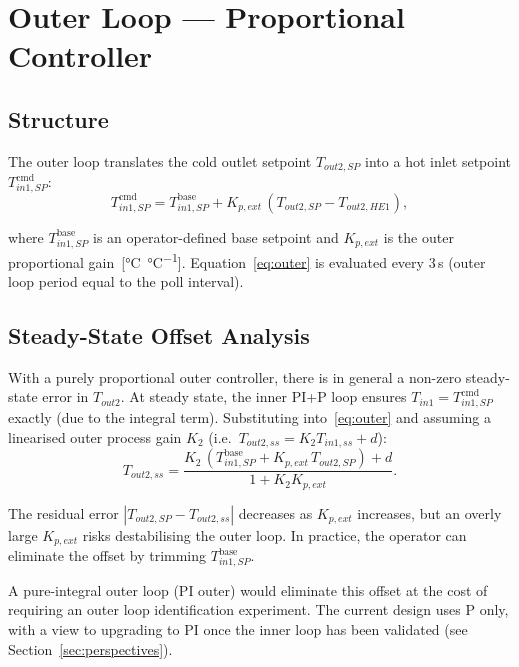 \section{Outer Loop --- Proportional Controller}

\subsection{Structure}

The outer loop translates the cold outlet setpoint $T_{out2,SP}$ into a hot inlet
setpoint $T_{in1,SP}^{\text{cmd}}$:
\begin{equation}
  T_{in1,SP}^{\text{cmd}}
  = T_{in1,SP}^{\text{base}} + K_{p,ext}\,(T_{out2,SP} - T_{out2,HE1}),
  \label{eq:outer}
\end{equation}

where $T_{in1,SP}^{\text{base}}$ is an operator-defined base setpoint and $K_{p,ext}$
is the outer proportional gain~[\si{\degreeCelsius\per\degreeCelsius}].
Equation~\eqref{eq:outer} is evaluated every 3\,s (outer loop period equal to the
poll interval).

\subsection{Steady-State Offset Analysis}

With a purely proportional outer controller, there is in general a non-zero
steady-state error in $T_{out2}$. At steady state, the inner PI+P loop ensures
$T_{in1} = T_{in1,SP}^{\text{cmd}}$ exactly (due to the integral term).
Substituting into~\eqref{eq:outer} and assuming a linearised outer process gain $K_2$
(i.e.\ $T_{out2,ss} = K_2 T_{in1,ss} + d$):
\begin{equation}
  T_{out2,ss}
  = \frac{K_2\,(T_{in1,SP}^{\text{base}} + K_{p,ext}\,T_{out2,SP}) + d}{1 + K_2 K_{p,ext}}.
  \label{eq:outer_ss}
\end{equation}

The residual error $|T_{out2,SP} - T_{out2,ss}|$ decreases as $K_{p,ext}$ increases,
but an overly large $K_{p,ext}$ risks destabilising the outer loop. In practice, the
operator can eliminate the offset by trimming $T_{in1,SP}^{\text{base}}$.

A pure-integral outer loop (PI outer) would eliminate this offset at the cost of requiring
an outer loop identification experiment. The current design uses P only, with a view to
upgrading to PI once the inner loop has been validated (see Section~\ref{sec:perspectives}).

